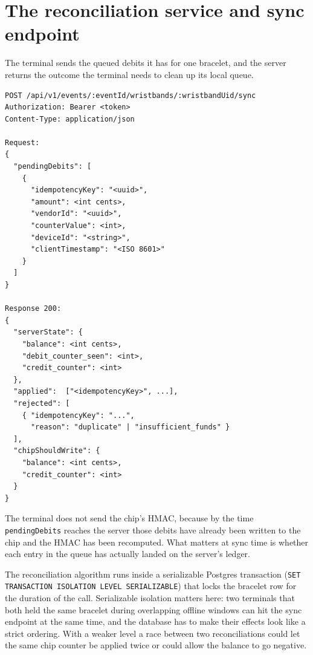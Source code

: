 \section{The reconciliation service and sync endpoint}
\label{sec:impl-sync}

The terminal sends the queued debits it has for one bracelet, and the server returns the outcome the terminal needs to clean up its local queue.

\begin{verbatim}
POST /api/v1/events/:eventId/wristbands/:wristbandUid/sync
Authorization: Bearer <token>
Content-Type: application/json

Request:
{
  "pendingDebits": [
    {
      "idempotencyKey": "<uuid>",
      "amount": <int cents>,
      "vendorId": "<uuid>",
      "counterValue": <int>,
      "deviceId": "<string>",
      "clientTimestamp": "<ISO 8601>"
    }
  ]
}

Response 200:
{
  "serverState": {
    "balance": <int cents>,
    "debit_counter_seen": <int>,
    "credit_counter": <int>
  },
  "applied":  ["<idempotencyKey>", ...],
  "rejected": [
    { "idempotencyKey": "...",
      "reason": "duplicate" | "insufficient_funds" }
  ],
  "chipShouldWrite": {
    "balance": <int cents>,
    "credit_counter": <int>
  }
}
\end{verbatim}

The terminal does not send the chip's HMAC, because by the time \texttt{pendingDebits} reaches the server those debits have already been written to the chip and the HMAC has been recomputed. What matters at sync time is whether each entry in the queue has actually landed on the server's ledger.

The reconciliation algorithm runs inside a serializable Postgres transaction (\texttt{SET TRANSACTION ISOLATION LEVEL SERIALIZABLE}) that locks the bracelet row for the duration of the call. Serializable isolation matters here: two terminals that both held the same bracelet during overlapping offline windows can hit the sync endpoint at the same time, and the database has to make their effects look like a strict ordering. With a weaker level a race between two reconciliations could let the same chip counter be applied twice or could allow the balance to go negative.


